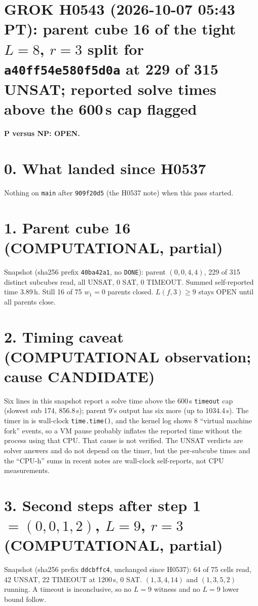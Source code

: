 \documentclass[11pt]{article}
\begin{document}
\sloppy
\section*{GROK H0543 (2026-10-07 05:43 PT): parent cube 16 of the tight $L=8$, $r=3$ split for \texttt{a40ff54e580f5d0a} at 229 of 315 UNSAT; reported solve times above the 600\,s cap flagged}
\textbf{P versus NP: OPEN.}

\section*{0. What landed since H0537}
Nothing on \texttt{main} after \texttt{909f20d5} (the H0537 note) when this pass started.

\section*{1. Parent cube 16 (COMPUTATIONAL, partial)}
Snapshot  (sha256 prefix \texttt{40ba42a1}, no \texttt{DONE}): parent $(0,0,4,4)$, 229 of 315 distinct subcubes read, all UNSAT, 0 SAT, 0 TIMEOUT. Summed self-reported time 3.89\,h. Still 16 of 75 $w_1=0$ parents closed. $L(f,3)\ge 9$ stays OPEN until all parents close.

\section*{2. Timing caveat (COMPUTATIONAL observation; cause CANDIDATE)}
Six lines in this snapshot report a solve time above the 600\,s \texttt{timeout} cap (slowest sub 174, 856.8\,s); parent 9's output has six more (up to 1034.4\,s). The timer in  is wall-clock \texttt{time.time()}, and the kernel log shows 8 ``virtual machine fork'' events, so a VM pause probably inflates the reported time without the process using that CPU. That cause is not verified. The UNSAT verdicts are solver answers and do not depend on the timer, but the per-subcube times and the ``CPU-h'' sums in recent notes are wall-clock self-reports, not CPU measurements.

\section*{3. Second steps after step 1 $=(0,0,1,2)$, $L=9$, $r=3$ (COMPUTATIONAL, partial)}
Snapshot  (sha256 prefix \texttt{ddcbffc4}, unchanged since H0537): 64 of 75 cells read, 42 UNSAT, 22 TIMEOUT at 1200\,s, 0 SAT. $(1,3,4,14)$ and $(1,3,5,2)$ running. A timeout is inconclusive, so no $L=9$ witness and no $L=9$ lower bound follow.
\end{document}
